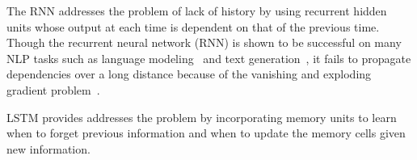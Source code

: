 \documentclass[11pt,letterpaper]{article}
\begin{document}
The RNN addresses the problem of lack of history by using recurrent hidden units whose output at each time is dependent on that of the previous time. 
Though the recurrent neural network (RNN) is shown to be successful on many NLP tasks such as language modeling~\cite{mikolov2010recurrent} and text generation~\cite{sutskever2011generating}, it fails to propagate dependencies over a long distance because of the vanishing and exploding gradient problem~\cite{hochreiter1997long}. 

LSTM provides addresses the problem by incorporating memory units to learn when to forget previous information and when to update the memory cells given new information.

\end{document}
